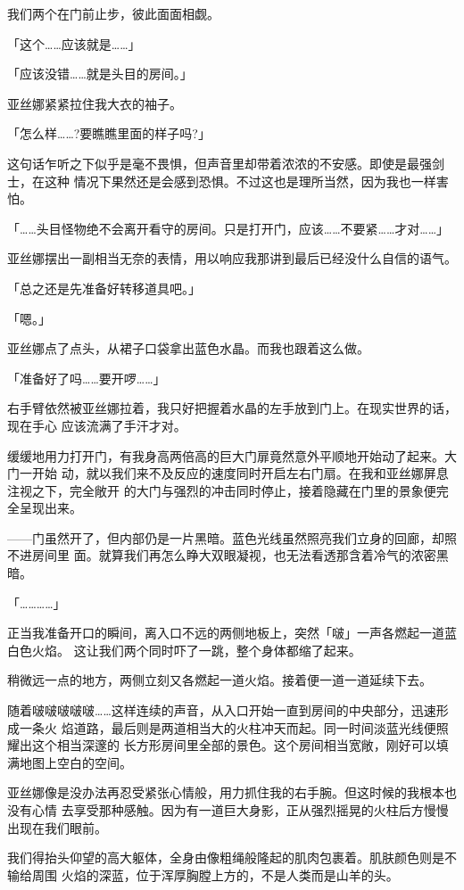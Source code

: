 \documentclass[11pt]{book}
\begin{document}
我们两个在门前止步，彼此面面相觑。

「这个……应该就是……」

「应该没错……就是头目的房间。」

亚丝娜紧紧拉住我大衣的袖子。

「怎么样……?要瞧瞧里面的样子吗?」

这句话乍听之下似乎是毫不畏惧，但声音里却带着浓浓的不安感。即使是最强剑士，在这种
情况下果然还是会感到恐惧。不过这也是理所当然，因为我也一样害怕。

「……头目怪物绝不会离开看守的房间。只是打开门，应该……不要紧……才对……」

亚丝娜摆出一副相当无奈的表情，用以响应我那讲到最后已经没什么自信的语气。

「总之还是先准备好转移道具吧。」

「嗯。」

亚丝娜点了点头，从裙子口袋拿出蓝色水晶。而我也跟着这么做。

「准备好了吗……要开啰……」

右手臂依然被亚丝娜拉着，我只好把握着水晶的左手放到门上。在现实世界的话，现在手心
应该流满了手汗才对。

缓缓地用力打开门，有我身高两倍高的巨大门扉竟然意外平顺地开始动了起来。大门一开始
动，就以我们来不及反应的速度同时开启左右门扇。在我和亚丝娜屏息注视之下，完全敞开
的大门与强烈的冲击同时停止，接着隐藏在门里的景象便完全呈现出来。

——门虽然开了，但内部仍是一片黑暗。蓝色光线虽然照亮我们立身的回廊，却照不进房间里
面。就算我们再怎么睁大双眼凝视，也无法看透那含着冷气的浓密黑暗。

「…………」

正当我准备开口的瞬间，离入口不远的两侧地板上，突然「啵」一声各燃起一道蓝白色火焰。
这让我们两个同时吓了一跳，整个身体都缩了起来。

稍微远一点的地方，两侧立刻又各燃起一道火焰。接着便一道一道延续下去。

随着啵啵啵啵啵……这样连续的声音，从入口开始一直到房间的中央部分，迅速形成一条火
焰道路，最后则是两道相当大的火柱冲天而起。同一时间淡蓝光线便照耀出这个相当深邃的
长方形房间里全部的景色。这个房间相当宽敞，刚好可以填满地图上空白的空间。

亚丝娜像是没办法再忍受紧张心情般，用力抓住我的右手腕。但这时候的我根本也没有心情
去享受那种感触。因为有一道巨大身影，正从强烈摇晃的火柱后方慢慢出现在我们眼前。

我们得抬头仰望的高大躯体，全身由像粗绳般隆起的肌肉包裹着。肌肤颜色则是不输给周围
火焰的深蓝，位于浑厚胸膛上方的，不是人类而是山羊的头。
\end{document}
